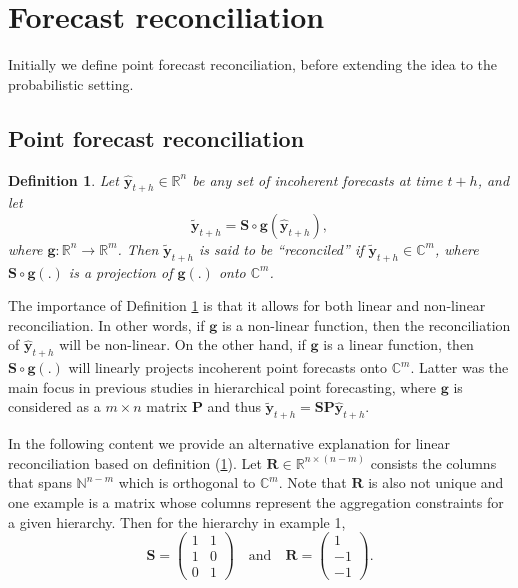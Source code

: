 \documentclass[a4paper, 11pt]{article}
\newtheorem{definition}{Definition}[section]
\begin{document}
\section{Forecast reconciliation}\label{sec:reconciliation}

Initially we define point forecast reconciliation, before extending the idea to the probabilistic setting.

\subsection{Point forecast reconciliation}


\begin{definition}\label{def:reconpoint}
  Let $\hat{\bm{y}}_{t+h} \in \mathbb{R}^n$ be any set of incoherent forecasts at time $t+h$, and let 
  \begin{equation}
    \tilde{\bm{y}}_{t+h}=\bm{S} \circ \bm{g}(\hat{\bm{y}}_{t+h}),
  \end{equation} 
  where $\bm{g}:\mathbb{R}^n \rightarrow \mathbb{R}^m$. Then $\tilde{\bm{y}}_{t+h}$ is said to be ``reconciled'' if  $\tilde{\bm{y}}_{t+h} \in \mathbb{C}^m$, where $\bm{S}\circ \bm{g}(.)$ is a projection of $\bm{g}(.)$ onto $\mathbb{C}^m$.
\end{definition}

The importance of Definition \ref{def:reconpoint} is that it allows for both linear and non-linear reconciliation. In other words, if $\bm{g}$ is a non-linear function, then the reconciliation of $\hat{\bm{y}}_{t+h}$ will be non-linear. On the other hand, if $\bm{g}$ is a linear function, then $\bm{S}\circ \bm{g}(.)$ will linearly projects incoherent point forecasts onto $\mathbb{C}^m$. Latter was the main focus in previous studies in hierarchical point forecasting, where $\bm{g}$ is considered as a $m \times n$ matrix $\bm{P}$ and thus $\tilde{\bm{y}}_{t+h}=\bm{S}\bm{P} \hat{\bm{y}}_{t+h}$. 

In the following content we provide an alternative explanation for linear reconciliation based on definition (\ref{def:reconpoint}). Let $\bm{R} \in \mathbb{R}^{n \times (n-m)}$ consists the columns that spans $\bm{\mathbb{N}}^{n-m}$ which is orthogonal to $\mathbb{C}^m$. Note that $\bm{R}$ is also not unique and one example is a matrix whose columns represent the aggregation constraints for a given hierarchy. Then for the hierarchy in example 1, 
$$ 
\bm{S} = 
\begin{pmatrix} 
1& 1 \\ 1 & 0 \\ 0&1 
\end{pmatrix} 
\quad \text{and} \quad 
\bm{R} = 
\begin{pmatrix}  
1 \\ -1 \\ -1 
\end{pmatrix}.
$$ 
\end{document}
